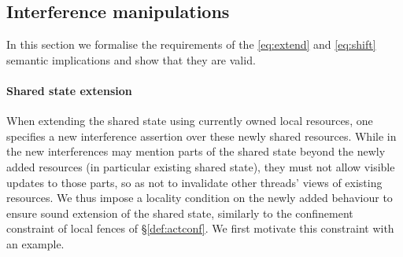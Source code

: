 %	
%


\subsection{Interference manipulations}\label{subsec:extension}


In this section we formalise the requirements of the \eqref{eq:extend}
and \eqref{eq:shift} semantic implications and show that they are
valid.

\paragraph{Shared state extension}
When extending the shared state using currently owned local resources,
one specifies a new interference assertion over these newly shared
resources. While in \colosl the new interferences may mention parts of
the shared state beyond the newly added resources (in particular
existing shared state), they must not allow visible updates to those
parts, so as not to invalidate other threads' views of existing
resources. We thus impose a locality condition on the newly added
behaviour to ensure sound extension of the shared state, similarly to
the confinement constraint of local fences of
\S\ref{def:actconf}. We first motivate this constraint with an example.

